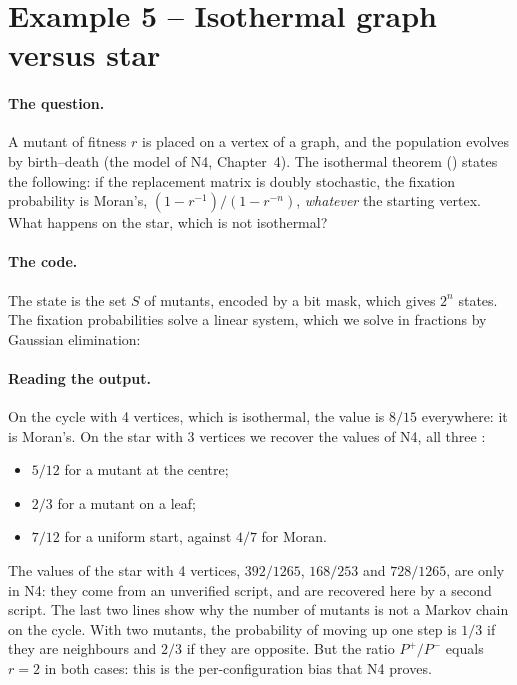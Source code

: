 \section{Example 5 -- Isothermal graph versus star}\label{appF:ex5}

\paragraph{The question.} A mutant of fitness $r$ is placed on a vertex of a graph, and the population evolves by
birth--death (the model of N4, Chapter~4). The isothermal theorem  (\tierA) states the following: if the
replacement matrix is doubly stochastic, the fixation probability is Moran's, $(1-r^{-1})/(1-r^{-n})$, \emph{whatever}
the starting vertex. What happens on the star, which is not isothermal?

\paragraph{The code.} The state is the set $S$ of mutants, encoded by a bit mask, which gives $2^n$ states. The fixation
probabilities solve a linear system, which we solve in fractions by Gaussian elimination:



\paragraph{Reading the output.} On the cycle with 4 vertices, which is isothermal, the value is $8/15$ everywhere: it is
Moran's. On the star with 3 vertices we recover the values of N4, all three \tierA{}:
\begin{itemize}
\item $5/12$ for a mutant at the centre;
\item $2/3$ for a mutant on a leaf;
\item $7/12$ for a uniform start, against $4/7$ for Moran.
\end{itemize}
The values of the star with 4 vertices, $392/1265$, $168/253$ and $728/1265$, are only \tierX{} in N4: they come from
an unverified script, and are recovered here by a second script. The last two lines show why the number of mutants is
not a Markov chain on the cycle. With two mutants, the probability of moving up one step is $1/3$ if they are
neighbours and $2/3$ if they are opposite. But the ratio $P^+/P^-$ equals $r=2$ in both cases: this is the
per-configuration bias that N4 proves.

